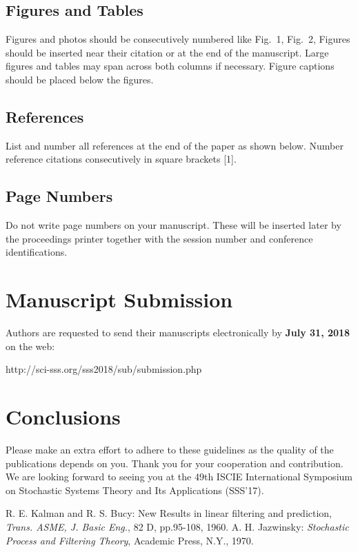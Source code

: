 \documentclass[a4paper]{article}
\begin{document}
\subsection{Figures and Tables} 
Figures and photos should be consecutively numbered like Fig{.}~1, Fig{.}~2,
Figures should be inserted near their citation or at the end of the manuscript.
Large figures and tables may span across both columns if necessary.
Figure captions should be placed below the figures. 

\subsection{References}
List and number all references at the end of the paper as shown below.
Number reference citations consecutively in square brackets [1].

\subsection{Page Numbers}
Do not write page numbers on your manuscript.
These will be inserted later by the proceedings printer together with
the session number and conference identifications.


\section{Manuscript Submission}
Authors are requested to send their manuscripts electronically by
{\bf July 31, 2018} on the web:
\begin{center}
http://sci-sss.org/sss2018/sub/submission.php
\end{center}


\section{Conclusions}

Please make an extra effort to adhere to these guidelines as the quality
of the publications depends on you.
Thank you for your cooperation and contribution.
We are looking forward to seeing you at the 49th ISCIE International Symposium
on Stochastic Systems Theory and Its Applications (SSS'17).


\begin{thebibliography}{99}
R. E. Kalman and R. S. Bucy: 
New Results in linear filtering and prediction, 
{\it Trans. ASME, J. Basic Eng.}, 82 D, pp.95-108, 1960.
A. H. Jazwinsky: 
{\it Stochastic Process and Filtering Theory}, Academic Press, N.Y., 1970.
\end{thebibliography}
\end{document}
